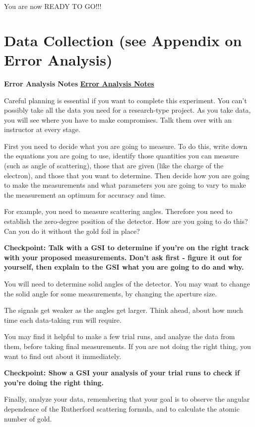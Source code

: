 \documentclass{../lab}
\begin{document}
You are now READY TO GO!!!

\section{Data Collection (see Appendix on Error Analysis)}

\textbf{Error Analysis Notes} \href{http://experimentationlab.berkeley.edu/EAX}{\textbf{Error Analysis Notes}}

Careful planning is essential if you want to complete this experiment. You can't possibly take all the data you need for a research-type project. As you take data, you will see where you have to make compromises. Talk them over with an instructor at every stage.

First you need to decide what you are going to measure. To do this, write down the equations you are going to use, identify those quantities you can measure (such as angle of scattering), those that are given (like the charge of the electron), and those that you want to determine. Then decide how you are going to make the measurements and what parameters you are going to vary to make the measurement an optimum for accuracy and time.

For example, you need to measure scattering angles. Therefore you need to establish the zero-degree position of the detector. How are you going to do this? Can you do it without the gold foil in place?

\textbf{Checkpoint: Talk with a GSI to determine if you're on the right track with your proposed measurements. Don't ask first - figure it out for yourself, then explain to the GSI what you are going to do and why.}

You will need to determine solid angles of the detector. You may want to change the solid angle for some measurements, by changing the aperture size.

The signals get weaker as the angles get larger. Think ahead, about how much time each data-taking run will require.

You may find it helpful to make a few trial runs, and analyze the data from them, before taking final measurements. If you are not doing the right thing, you want to find out about it immediately.

\textbf{Checkpoint: Show a GSI your analysis of your trial runs to check if you're doing the right thing.}

Finally, analyze your data, remembering that your goal is to observe the angular dependence of the Rutherford scattering formula, and to calculate the atomic number of gold.
\end{document}

